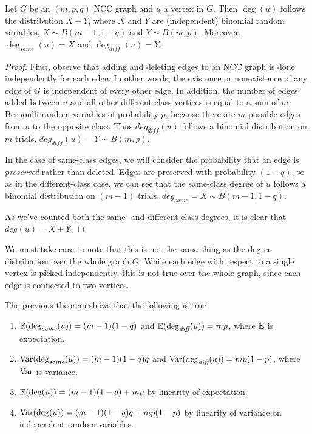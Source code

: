 \begin{theorem}
  \label{thm:ncc_deg}
  Let $G$ be an $(m,p,q)$ NCC graph and $u$ a vertex in $G$. Then $\deg(u)$ follows the distribution
  $X + Y$, where $X$ and $Y$ are (independent) binomial random variables, $X \sim B(m-1,1-q)$ and
  $Y \sim B(m,p)$. Moreover, $\deg_{\textit{same}}(u) = X$ and $\deg_{\textit{diff}}(u) = Y$.
\end{theorem}
\begin{proof}
  First, observe that adding and deleting edges to an NCC graph is done independently for each edge.
  In other words, the existence or nonexistence of any edge of $G$ is independent of every other edge.
  In addition, the number of edges added between $u$ and all other different-class vertices is equal
  to a sum of $m$ Bernoulli random variables of probability $p$, because there are $m$ possible edges
  from $u$ to the opposite class. Thus $deg_{diff}(u)$ follows a binomial distribution on $m$ trials,
  $deg_{diff}(u) = Y \sim B(m,p)$.

  In the case of same-class edges, we will consider the probability that an edge is \textit{preserved}
  rather than deleted. Edges are preserved with probability $(1-q)$, so as in the different-class
  case, we can see that the same-class degree of $u$ follows a binomial distribution on $(m-1)$
  trials, $deg_{same} = X \sim B(m-1,1-q)$.

  As we've counted both the same- and different-class degrees, it is clear that $deg(u) = X + Y$.
\end{proof}

We must take care to note that this is not the same thing as the degree distribution over the whole
graph $G$. While each edge with respect to a single vertex is picked independently, this is not true
over the whole graph, since each edge is connected to two vertices.

\begin{remark}
  The previous theorem shows that the following is true
  \begin{enumerate}
  \item $\mathbb{E}(\deg_{\textit{same}}(u)) = (m-1)(1-q)$ and $\mathbb{E}(\deg_{\textit{diff}}(u)) = mp$, where $\mathbb{E}$ is expectation.
  \item $\mathrm{Var}(\deg_{\textit{same}}(u)) = (m-1)(1-q)q$ and $\mathrm{Var}(\deg_{\textit{diff}}(u)) = mp(1-p)$, where $\mathrm{Var}$ is
    variance.
  \item $\mathbb{E}(\deg(u)) = (m-1)(1-q) + mp$ by linearity of expectation.
  \item $\mathrm{Var}(\deg(u)) = (m-1)(1-q)q + mp(1-p)$ by linearity of variance on independent random
    variables.
  \end{enumerate}
\end{remark}

